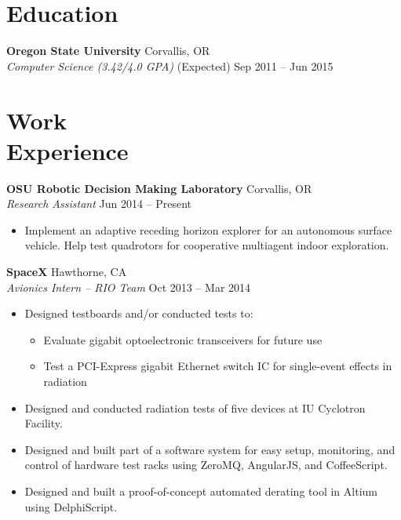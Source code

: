 \documentclass[10pt,letterpaper,margin]{res}
\begin{document}
\begin{resume}

\section{Education}

{\bf Oregon State University} \hfill {\color{lightgray} Corvallis, OR} \\
{\it Computer Science (3.42/4.0 GPA)} \hfill {\color{lightgray} (Expected) Sep 2011 -- Jun 2015}\vspace{0.0em}


\section{Work \\ Experience}

{\bf OSU Robotic Decision Making Laboratory} \hfill {\color{lightgray} Corvallis, OR} \\
{\it Research Assistant} \hfill {\color{lightgray} Jun 2014 -- Present}\vspace{0.0em}

\begin{itemize}
    \item Implement an adaptive receding horizon explorer for an autonomous
        surface vehicle. Help test quadrotors for cooperative multiagent indoor
        exploration.
\end{itemize}


{\bf SpaceX} \hfill {\color{lightgray} Hawthorne, CA} \\
{\it Avionics Intern -- RIO Team} \hfill {\color{lightgray} Oct 2013 -- Mar 2014}\vspace{0.0em}

\begin{itemize}
    \item Designed testboards and/or conducted tests to:
        \begin{itemize}
            \item Evaluate gigabit optoelectronic transceivers for future use
            \item Test a PCI-Express gigabit Ethernet switch IC for
                single-event effects in radiation
        \end{itemize}
    \item Designed and conducted radiation tests of five devices at IU
        Cyclotron Facility.
    \item Designed and built part of a software system for easy setup,
        monitoring, and control of hardware test racks using ZeroMQ, AngularJS,
        and CoffeeScript.
    \item Designed and built a proof-of-concept automated derating tool in
        Altium using DelphiScript.
\end{itemize}



\end{resume}
\end{document}
